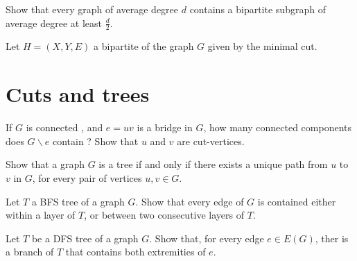 \documentclass{article}
\theoremstyle{plain}
\begin{document}
  \begin{correction}{}{}
  \end{correction}

  \exercice Show that every graph of average degree $d$ contains a bipartite
  subgraph of average degree at least $\frac d 2$.

  \begin{correction}{}{}
    Let $H = (X, Y, E)$ a bipartite of the graph $G$ given by the minimal cut.
  \end{correction}

  \section{Cuts and trees}

  \exercice If $G$ is connected , and $e=uv$ is a bridge in $G$, how many
  connected components does $G\backslash e$ contain ? Show that $u$ and $v$ are
  cut-vertices.

  \exercice Show that a graph $G$ is a tree if and only if there exists a unique
  path from $u$ to $v$ in $G$, for every pair of vertices $u, v \in G$.

  \exercice Let $T$ a BFS tree of a graph $G$. Show that every edge of $G$ is
  contained either within a layer of $T$, or between two consecutive layers of
  $T$.

  \exercice Let $T$ be a DFS tree of a graph $G$. Show that, for every edge $e
  \in E(G)$, ther is a branch of $T$ that contains both extremities of $e$.
\end{document}
